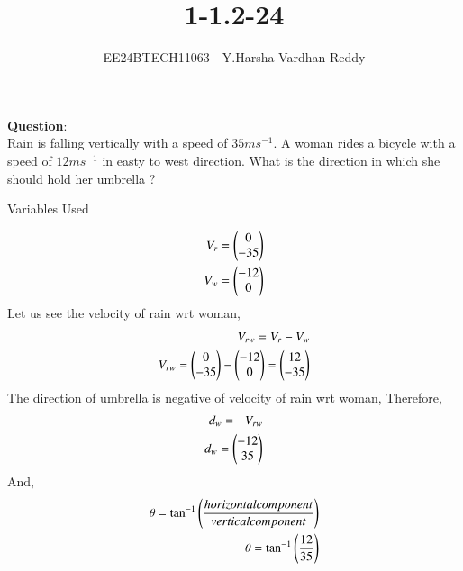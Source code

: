 \documentclass[journal]{IEEEtran}
\begin{document}

\vspace{3cm}

\title{1-1.2-24}
\author{EE24BTECH11063 - Y.Harsha Vardhan Reddy
}
{\let\newpage\relax\maketitle}

\renewcommand{\thefigure}{\theenumi}
\renewcommand{\thetable}{\theenumi}
\setlength{\intextsep}{10pt} %


\renewcommand{\thetable}{\theenumi}
\textbf{Question}:\\
Rain is falling vertically with a speed of $35ms^{-1}$. A woman rides a bicycle with a speed of $12ms^{-1}$ in easty to west direction. What is the direction in which she should hold her umbrella ?
\\
\solution
\begin{table}[h!]    
  \centering
  
  \caption{Variables Used}
  \label{tab1-1.2-20}
\end{table}
\begin{align}
V_r=\begin{pmatrix}0\\-35\end{pmatrix} \\
V_w=\begin{pmatrix}-12\\0\end{pmatrix} 
\end{align}
Let us see the velocity of rain wrt woman,
\begin{align}
V_{rw}=V_r-V_w \\
V_{rw}=\begin{pmatrix}0\\-35\end{pmatrix}-\begin{pmatrix}-12\\0\end{pmatrix}=\begin{pmatrix}12\\-35\end{pmatrix}
\end{align}
The direction of umbrella is negative of velocity of rain wrt woman,
Therefore,
\begin{align}
    d_w=-V_{rw} \\
    d_w=\begin{pmatrix}-12\\35\end{pmatrix}
\end{align}
And,
\begin{align}
    \theta = \tan^{-1}\left(\frac{horizontal component}{vertical component}\right)\\
    \theta = \tan^{-1}\left(\frac{12}{35}\right)
\end{align}
\end{document}
